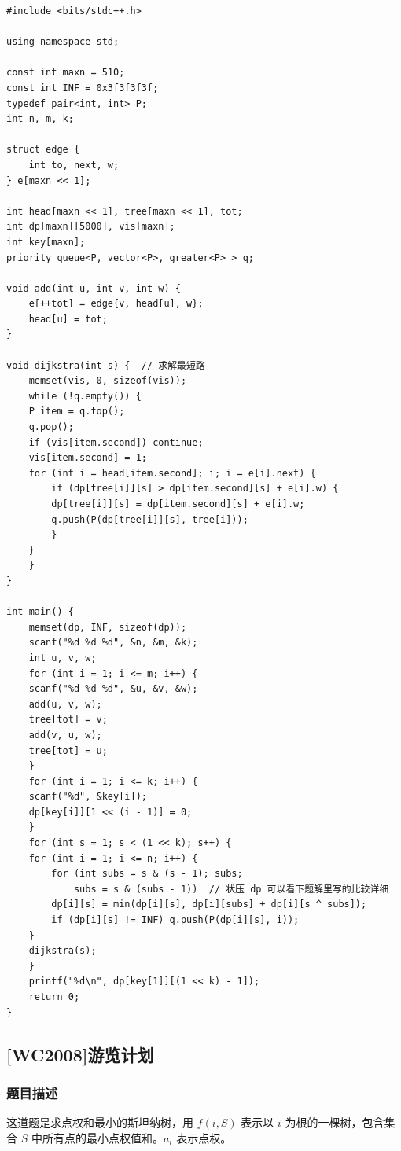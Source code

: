 \documentclass{SCIS2022cn}
\begin{document}
\begin{lstlisting}
#include <bits/stdc++.h>

using namespace std;

const int maxn = 510;
const int INF = 0x3f3f3f3f;
typedef pair<int, int> P;
int n, m, k;

struct edge {
    int to, next, w;
} e[maxn << 1];

int head[maxn << 1], tree[maxn << 1], tot;
int dp[maxn][5000], vis[maxn];
int key[maxn];
priority_queue<P, vector<P>, greater<P> > q;

void add(int u, int v, int w) {
    e[++tot] = edge{v, head[u], w};
    head[u] = tot;
}

void dijkstra(int s) {  // 求解最短路
    memset(vis, 0, sizeof(vis));
    while (!q.empty()) {
    P item = q.top();
    q.pop();
    if (vis[item.second]) continue;
    vis[item.second] = 1;
    for (int i = head[item.second]; i; i = e[i].next) {
        if (dp[tree[i]][s] > dp[item.second][s] + e[i].w) {
        dp[tree[i]][s] = dp[item.second][s] + e[i].w;
        q.push(P(dp[tree[i]][s], tree[i]));
        }
    }
    }
}

int main() {
    memset(dp, INF, sizeof(dp));
    scanf("%d %d %d", &n, &m, &k);
    int u, v, w;
    for (int i = 1; i <= m; i++) {
    scanf("%d %d %d", &u, &v, &w);
    add(u, v, w);
    tree[tot] = v;
    add(v, u, w);
    tree[tot] = u;
    }
    for (int i = 1; i <= k; i++) {
    scanf("%d", &key[i]);
    dp[key[i]][1 << (i - 1)] = 0;
    }
    for (int s = 1; s < (1 << k); s++) {
    for (int i = 1; i <= n; i++) {
        for (int subs = s & (s - 1); subs;
            subs = s & (subs - 1))  // 状压 dp 可以看下题解里写的比较详细
        dp[i][s] = min(dp[i][s], dp[i][subs] + dp[i][s ^ subs]);
        if (dp[i][s] != INF) q.push(P(dp[i][s], i));
    }
    dijkstra(s);
    }
    printf("%d\n", dp[key[1]][(1 << k) - 1]);
    return 0;
}
\end{lstlisting}

\subsection{[WC2008]游览计划}

\subsubsection*{题目描述}

这道题是求点权和最小的斯坦纳树，用 $f(i,S)$ 表示以 $i$ 为根的一棵树，包含集合 $S$ 中所有点的最小点权值和。$a_i$ 表示点权。
\end{document}
